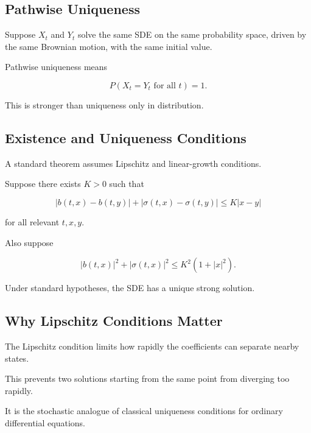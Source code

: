 \subsection{Pathwise Uniqueness}
\label{subsec:pathwise-uniqueness}

Suppose \(X_t\) and \(Y_t\) solve the same SDE on the same probability
space, driven by the same Brownian motion, with the same initial value.

Pathwise uniqueness means

\[
\boxed{
P
\left(
X_t=Y_t
\text{ for all }t
\right)
=
1.
}
\]

This is stronger than uniqueness only in distribution.

\subsection{Existence and Uniqueness Conditions}
\label{subsec:sde-existence-uniqueness}

A standard theorem assumes Lipschitz and linear-growth conditions.

Suppose there exists \(K>0\) such that

\[
\boxed{
|b(t,x)-b(t,y)|
+
|\sigma(t,x)-\sigma(t,y)|
\leq
K|x-y|
}
\]

for all relevant \(t,x,y\).

Also suppose

\[
\boxed{
|b(t,x)|^2
+
|\sigma(t,x)|^2
\leq
K^2(1+|x|^2).
}
\]

Under standard hypotheses, the SDE has a unique strong solution.

\subsection{Why Lipschitz Conditions Matter}
\label{subsec:why-lipschitz-sde}

The Lipschitz condition limits how rapidly the coefficients can separate
nearby states.

This prevents two solutions starting from the same point from diverging
too rapidly.

It is the stochastic analogue of classical uniqueness conditions for
ordinary differential equations.


